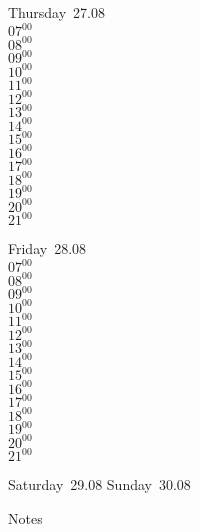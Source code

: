 \documentclass[11pt,a4paper]{book}\usepackage[]{graphicx}\usepackage[]{color}
\begin{document}
\clearpage
\begin{headerbox}
\end{headerbox}
\begin{weekdaybox}
  Thursday~27.08\\
  { 
  \vfill
  $07^{00}$\\
$08^{00}$\\
$09^{00}$\\
$10^{00}$\\
$11^{00}$\\
$12^{00}$\\
$13^{00}$\\
$14^{00}$\\
$15^{00}$\\
$16^{00}$\\
$17^{00}$\\
$18^{00}$\\
$19^{00}$\\
$20^{00}$\\
$21^{00}$\\
  }
\end{weekdaybox} 
\begin{weekdaybox}
  Friday~28.08\\
  { 
  \vfill
  $07^{00}$\\
$08^{00}$\\
$09^{00}$\\
$10^{00}$\\
$11^{00}$\\
$12^{00}$\\
$13^{00}$\\
$14^{00}$\\
$15^{00}$\\
$16^{00}$\\
$17^{00}$\\
$18^{00}$\\
$19^{00}$\\
$20^{00}$\\
$21^{00}$\\
  }
\end{weekdaybox}
\begin{weekendbox}
  Saturday~29.08
  \tcblower
  Sunday~30.08
\end{weekendbox} %
\begin{notebox}
  Notes
\end{notebox}
\clearpage
\end{document}
